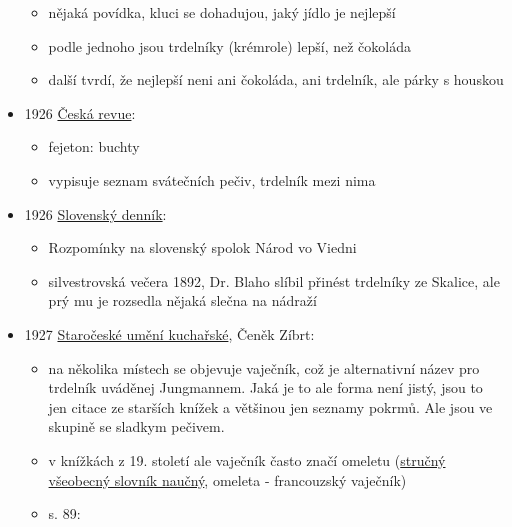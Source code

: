 \begin{itemize}
  \begin{itemize}
  \tightlist
  \item
    nějaká povídka, kluci se dohadujou, jaký jídlo je nejlepší
  \item
    podle jednoho jsou trdelníky (krémrole) lepší, než čokoláda
  \item
    další tvrdí, že nejlepší neni ani čokoláda, ani trdelník, ale párky
    s houskou
  \end{itemize}
\item
  1926
  \href{https://ceskadigitalniknihovna.cz/uuid/uuid:58b8aad0-3d9c-11e8-b52f-5ef3fc9ae867}{Česká
  revue}:

  \begin{itemize}
  \tightlist
  \item
    fejeton: buchty
  \item
    vypisuje seznam svátečních pečiv, trdelník mezi nima
  \end{itemize}
\item
  1926
  \href{https://dikda.snk.sk/uuid/uuid:5fb6cb8d-edec-4464-96b8-64c6c9ed47a7}{Slovenský
  denník}:

  \begin{itemize}
  \tightlist
  \item
    Rozpomínky na slovenský spolok Národ vo Viedni
  \item
    silvestrovská večera 1892, Dr. Blaho slíbil přinést trdelníky ze
    Skalice, ale prý mu je rozsedla nějaká slečna na nádraží
  \end{itemize}
\item
  1927
  \href{https://ndk.cz/uuid/uuid:b59a1ff0-9f23-11ea-b6e0-005056827e51}{Staročeské
  umění kuchařské}, Čeněk Zíbrt:

  \begin{itemize}
  \tightlist
  \item
    na několika místech se objevuje vaječník, což je alternativní název
    pro trdelník uváděnej Jungmannem. Jaká je to ale forma není jistý,
    jsou to jen citace ze starších knížek a většinou jen seznamy pokrmů.
    Ale jsou ve skupině se sladkym pečivem.
  \item
    v knížkách z 19. století ale vaječník často značí omeletu
    (\href{https://ndk.cz/uuid/uuid:f7e03900-d300-11dc-9815-000d606f5dc6}{stručný
    všeobecný slovník naučný}, omeleta - francouzský vaječník)
  \item
    s. 89:


\end{itemize}
\end{itemize}
